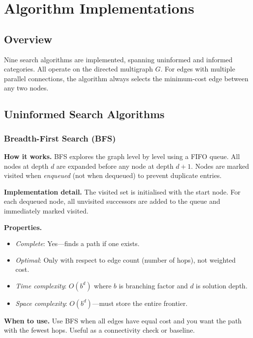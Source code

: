 ﻿\documentclass[a4paper, 12pt]{article}
\theoremstyle{remark}
\begin{document}
\section{Algorithm Implementations}

\subsection{Overview}

Nine search algorithms are implemented, spanning uninformed and informed categories. All operate on the directed multigraph $G$. For edges with multiple parallel connections, the algorithm always selects the minimum-cost edge between any two nodes.

\subsection{Uninformed Search Algorithms}

\subsubsection{Breadth-First Search (BFS)}

\textbf{How it works.} BFS explores the graph level by level using a FIFO queue. All nodes at depth $d$ are expanded before any node at depth $d+1$. Nodes are marked visited when \emph{enqueued} (not when dequeued) to prevent duplicate entries.

\textbf{Implementation detail.} The visited set is initialised with the start node. For each dequeued node, all unvisited successors are added to the queue and immediately marked visited.

\textbf{Properties.}
\begin{itemize}
    \item \emph{Complete}: Yes---finds a path if one exists.
    \item \emph{Optimal}: Only with respect to edge count (number of hops), not weighted cost.
    \item \emph{Time complexity}: $O(b^d)$ where $b$ is branching factor and $d$ is solution depth.
    \item \emph{Space complexity}: $O(b^d)$---must store the entire frontier.
\end{itemize}

\textbf{When to use.} Use BFS when all edges have equal cost and you want the path with the fewest hops. Useful as a connectivity check or baseline.
\end{document}
